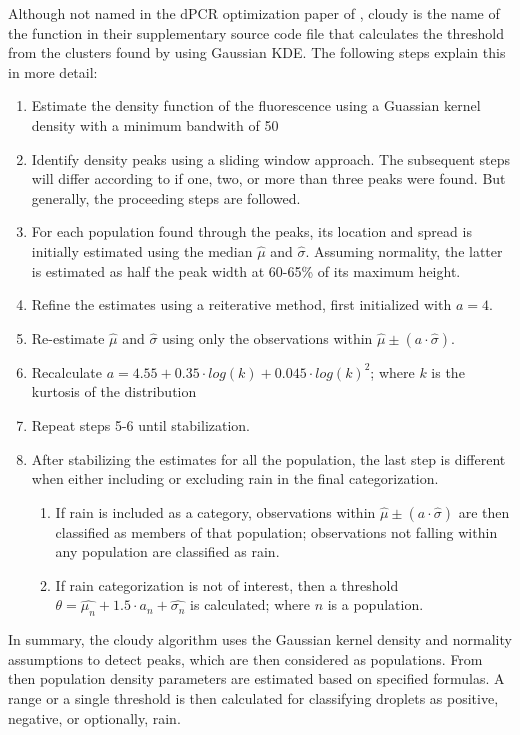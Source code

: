 Although not named in the dPCR optimization paper of , cloudy is the name of the function in their supplementary source code file that calculates the threshold from the clusters found by using Gaussian KDE. The following steps explain this in more detail:
\begin{enumerate}
    \item Estimate the density function of the fluorescence using a Guassian kernel density with a minimum bandwith of 50
    \item Identify density peaks using a sliding window approach. The subsequent steps will differ according to if one, two, or more than three peaks were found.  But generally, the proceeding steps are followed.
    \item For each population found through the peaks, its location and spread is initially estimated using the median \(\hat{\mu}\) and \(\hat{\sigma}\). Assuming normality, the latter is estimated as half the peak width at 60-65\% of its maximum height.
    \item Refine the estimates using a reiterative method, first initialized with \(a=4\).
    \item Re-estimate \(\hat{\mu}\) and \(\hat{\sigma}\) using only the observations within \(\hat{\mu} \pm (a \cdot \hat{\sigma})\).
    \item Recalculate \(a=4.55 + 0.35 \cdot log(k) + 0.045 \cdot log(k)^2\); where \(k\) is the kurtosis of the distribution
    \item Repeat steps 5-6 until stabilization.
    \item After stabilizing the estimates for all the population, the last step is different when either including or excluding rain in the final categorization. 
    \begin{enumerate}
        \item If rain is included as a category, observations within \(\hat{\mu} \pm (a \cdot \hat{\sigma})\) are then classified as members of that population; observations not falling within any population are classified as rain.
        \item If rain categorization is not of interest, then a threshold \(\theta=\hat{\mu_n} + 1.5 \cdot a_n + \hat{\sigma_n}\) is calculated; where \(n\) is a population.  
    \end{enumerate}

\end{enumerate}

In summary, the cloudy algorithm uses the Gaussian kernel density and normality assumptions to detect peaks, which are then considered as populations. From then population density parameters are estimated based on specified formulas. A range or a single threshold is then calculated for classifying droplets as positive, negative, or optionally, rain.

